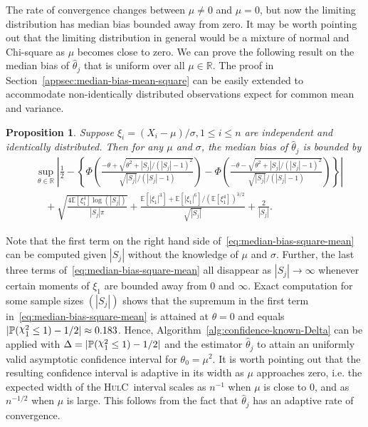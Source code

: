\documentclass{article}
\newcommand{\hulc}{\textsc{HulC}~}
\newtheorem{prop}{Proposition}
\numberwithin{myalgctr}{section}
\DeclareRobustCommand{\rchi}{{\mathpalette\irchi\relax}}
\newcommand{\irchi}[2]{\raisebox{\depth}{$#1\chi$}}
\begin{document}
The rate of convergence changes between $\mu \neq 0$ and $\mu = 0$, but now the limiting distribution has median bias bounded away from zero. It may be worth pointing out that the limiting distribution in general would be a mixture of normal and Chi-square as $\mu$ becomes close to zero. We can prove the following result on the median bias of $\widehat{\theta}_j$ that is uniform over all $\mu\in\mathbb{R}$. The proof in Section~\ref{appsec:median-bias-mean-square} can be easily extended to accommodate non-identically distributed observations expect for common mean and variance.
\begin{prop}\label{prop:median-bias-mean-square}
Suppose $\xi_i = (X_i - \mu)/\sigma, 1\le i\le n$ are independent and identically distributed. Then for any $\mu$ and $\sigma$, the median bias of $\widehat{\theta}_j$ is bounded by
\begin{equation}\label{eq:median-bias-square-mean}
\begin{split}
&\sup_{\theta\in\mathbb{R}}\left|\frac{1}{2} - \left\{\Phi\left(\frac{-\theta + \sqrt{\theta^2 + |S_j|/(|S_j|-1)^2}}{\sqrt{|S_j|}/(|S_j|-1)}\right) - \Phi\left(\frac{-\theta-\sqrt{\theta^2 + |S_j|/(|S_j|-1)^2}}{\sqrt{|S_j|}/(|S_j|-1)}\right)\right\}\right|\\ 
&\quad+ \sqrt{\frac{4\mathbb{E}[\xi_1^4]\log(|S_j|)}{|S_j|\pi}} + \frac{\mathbb{E}[|\xi_1|^3] + \mathbb{E}[|\xi_1|^6]/(\mathbb{E}[\xi_1^4])^{3/2}}{\sqrt{|S_j|}} + \frac{2}{|S_j|}.
\end{split}
\end{equation}
\end{prop}
Note that the first term on the right hand side of~\eqref{eq:median-bias-square-mean} can be computed given $|S_j|$ without the knowledge of $\mu$ and $\sigma$. Further, the last three terms of~\eqref{eq:median-bias-square-mean} all disappear as $|S_j|\to\infty$ whenever certain moments of $\xi_1$ are bounded away from $0$ and $\infty$. Exact computation for some sample sizes $(|S_j|)$ shows that the supremum in the first term in~\eqref{eq:median-bias-square-mean} is attained at $\theta = 0$ and equals $|\mathbb{P}(\rchi^2_1 \le 1) - 1/2|\approx 0.183$. Hence, Algorithm~\ref{alg:confidence-known-Delta} can be applied with $\Delta = |\mathbb{P}(\rchi^2_1 \le 1) - 1/2|$ and the estimator $\widehat{\theta}_j$ to attain an uniformly valid asymptotic confidence interval for $\theta_0 = \mu^2$. It is worth pointing out that the resulting confidence interval is adaptive in its width as $\mu$ approaches zero, i.e. the expected width of the \hulc interval scales as $n^{-1}$ when $\mu$ is close to 0, and as $n^{-1/2}$ when $\mu$ is large. 
This follows from the fact that $\widehat{\theta}_j$ has an adaptive rate of convergence.
\end{document}
